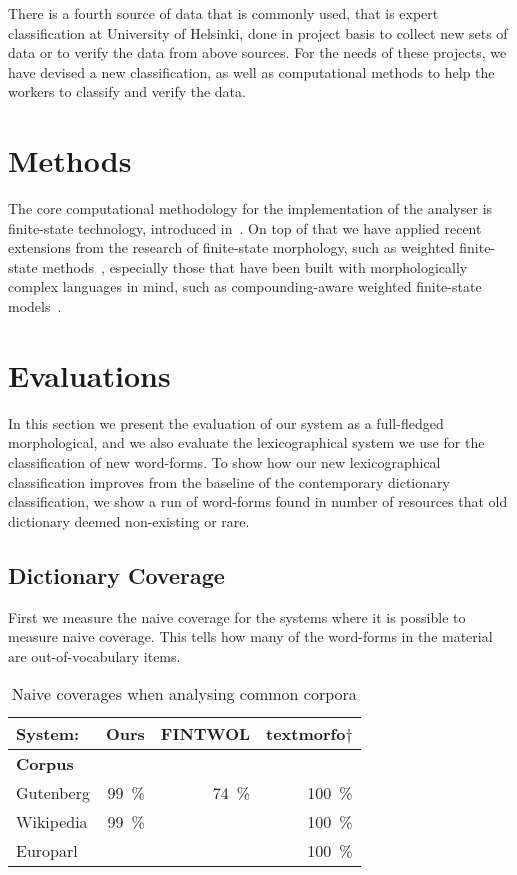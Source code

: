 \documentclass[a4paper,12pt]{article}
\begin{document}
There is a fourth source of data that is commonly used, that is expert
classification at University of Helsinki, done in project basis to collect
new sets of data or to verify the data from above sources. For the needs of
these projects, we have devised a new classification, as well as computational
methods to help the workers to classify and verify the data.

\section{Methods}

The core computational methodology for the implementation of the analyser is
finite-state technology, introduced
in~\cite{koskenniemi1983twolevel,beesley2003finitestate}. On top of that we
have applied recent extensions from the research of finite-state morphology,
such as weighted finite-state methods~\cite{hfst2012}, especially those
that have been  built with morphologically complex languages in mind, such
as compounding-aware weighted finite-state models~\cite{pirinen2009weighted}.

\section{Evaluations}

In this section we present the evaluation of our system as a full-fledged
morphological, and we also evaluate the lexicographical system we use for
the classification of new word-forms. To show how our new lexicographical
classification improves from the baseline of the contemporary dictionary
classification, we show a run of word-forms found in number of resources that
old dictionary deemed non-existing or rare.

\subsection{Dictionary Coverage}

First we measure the naive coverage for the systems where it is possible to
measure naive coverage. This tells how many of the word-forms in the material
are out-of-vocabulary items. 

\begin{table}
    \centering
    \begin{tabular}{|l|r|r|r|}
        \hline
        \bf System: & Ours & FINTWOL & textmorfo$\dagger$ \\
        \hline
        \bf Corpus & & & \\
        \hline
        Gutenberg & 99~\% & 74~\% & 100~\% \\
        Wikipedia & 99~\% &       & 100~\% \\
        Europarl  &       &       & 100~\% \\
        \hline
    \end{tabular}
    \caption{Naive coverages when analysing common corpora
    \label{table:coverage}}
\end{table}
\end{document}
